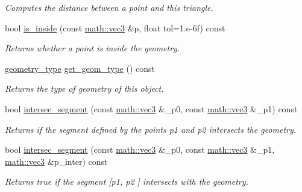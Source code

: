 \begin{DoxyCompactItemize}
\begin{DoxyCompactList}\small\item\em Computes the distance between a point and this triangle. \end{DoxyCompactList}\item 
bool \hyperlink{classphysim_1_1geometry_1_1triangle_aa63eb64a152db96607423c9c30e5dd01}{is\+\_\+inside} (const \hyperlink{structphysim_1_1math_1_1vec3}{math\+::vec3} \&p, float tol=1.e-\/6f) const
\begin{DoxyCompactList}\small\item\em Returns whether a point is inside the geometry. \end{DoxyCompactList}\item 
\mbox{\label{classphysim_1_1geometry_1_1triangle_af46c36c6dd8f7319bcbf5cd38cdf639e}} 
\hyperlink{namespacephysim_1_1geometry_a60e1ee7ea6f443f8ec9341ca7f12f1b7}{geometry\+\_\+type} \hyperlink{classphysim_1_1geometry_1_1triangle_af46c36c6dd8f7319bcbf5cd38cdf639e}{get\+\_\+geom\+\_\+type} () const
\begin{DoxyCompactList}\small\item\em Returns the type of geometry of this object. \end{DoxyCompactList}\item 
bool \hyperlink{classphysim_1_1geometry_1_1triangle_ae030bd068acc074aaf7321fd3378a1ad}{intersec\+\_\+segment} (const \hyperlink{structphysim_1_1math_1_1vec3}{math\+::vec3} \&\+\_\+p0, const \hyperlink{structphysim_1_1math_1_1vec3}{math\+::vec3} \&\+\_\+p1) const
\begin{DoxyCompactList}\small\item\em Returns if the segment defined by the points {\itshape p1} and {\itshape p2} intersects the geometry. \end{DoxyCompactList}\item 
bool \hyperlink{classphysim_1_1geometry_1_1triangle_a7058cb649cd4617d868627217c9de841}{intersec\+\_\+segment} (const \hyperlink{structphysim_1_1math_1_1vec3}{math\+::vec3} \&\+\_\+p0, const \hyperlink{structphysim_1_1math_1_1vec3}{math\+::vec3} \&\+\_\+p1, \hyperlink{structphysim_1_1math_1_1vec3}{math\+::vec3} \&p\+\_\+inter) const
\begin{DoxyCompactList}\small\item\em Returns true if the segment \mbox{[}{\itshape p1}, {\itshape p2} \mbox{]} intersects with the geometry. \end{DoxyCompactList}\item 

\end{DoxyCompactItemize}
